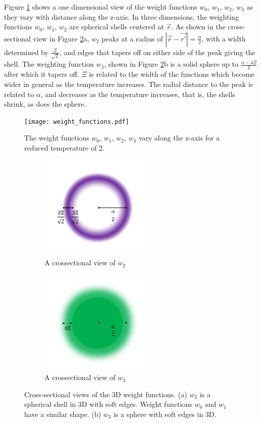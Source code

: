 \documentclass[double,12pt]{beavtex}
\begin{document}
Figure \ref{fig:weight_functions} shows a one dimensional view of the weight functions 
$w_0$, $w_1$, $w_2$, $w_3$ as they vary with distance along the z-axis. In three 
dimensions, the weighting functions $w_0$, $w_1$, $w_2$ are spherical shells 
centered at $\vec{r}$. As shown in the cross-sectional view in Figure \ref{fig:W0andW3}a, 
$w_2$ peaks at a radius of $|\vec{r}-\vec{r'}|=\frac{\alpha}{2}$, with a width determined 
by $\frac{\Xi}{\sqrt{2}}$, and edges that tapers off on either side of the peak giving 
the shell. The weighting function $w_3$, shown in Figure \ref{fig:W0andW3}b is a solid 
sphere up to $\frac{\alpha-4\Xi}{2}$ after which it tapers off. 
$\Xi$ is related to the width of the functions which 
become wider in general as the temperature increases. 
The radial distance 
to the peak is related to $\alpha$, and decreases as the temperature 
increases, that is, the shells shrink, as does 
the sphere.

\begin{figure}[h!]
    \centering
    \texttt{[image: weight\_functions.pdf]}
    \caption{The weight functions $w_0$, $w_1$, $w_2$, $w_3$ vary along the 
    z-axis for a reduced temperature of 2.}
    \label{fig:weight_functions}
  \end{figure}  

 \begin{figure}[h!]
    \centering
    \begin{subfigure}[b]{0.4\linewidth}
      \includegraphics[height=5cm]{W2.png}
      \caption{A crossectional view of $w_2$}
    \end{subfigure} 
    \begin{subfigure}[b]{0.4\linewidth}
      \includegraphics[height=5cm]{W3.png}
      \caption{A crossectional view of $w_3$}
    \end{subfigure} 
    \caption{Cross-sectional views of the 3D weight functions. (a) $w_2$ is a 
    spherical shell in 3D with soft edges. Weight functions $w_0$ and $w_1$ 
    have a similar shape. (b) $w_3$ is a sphere with soft edges in 3D.}
    \label{fig:W0andW3}
    \end{figure} 
\end{document}
